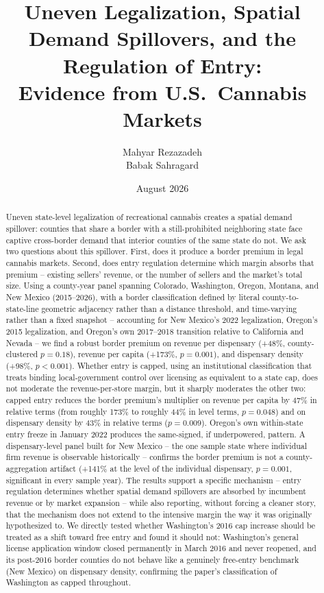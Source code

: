 \documentclass[12pt]{article}
\title{Uneven Legalization, Spatial Demand Spillovers, and the Regulation of Entry:\\
Evidence from U.S.\ Cannabis Markets}
\author{Mahyar Rezazadeh \\ Babak Sahragard}
\date{August 2026}
\begin{document}
\maketitle

\begin{singlespace}
\begin{abstract}
\noindent Uneven state-level legalization of recreational cannabis creates a spatial demand spillover: counties
that share a border with a still-prohibited neighboring state face captive cross-border demand that interior
counties of the same state do not. We ask two questions about this spillover. First, does it produce a border
premium in legal cannabis markets. Second, does entry regulation determine which margin absorbs that premium
-- existing sellers' revenue, or the number of sellers and the market's total size. Using a county-year panel
spanning Colorado, Washington, Oregon, Montana, and New Mexico (2015--2026), with a border classification
defined by literal county-to-state-line geometric adjacency rather than a distance threshold, and time-varying
rather than a fixed snapshot -- accounting for New Mexico's 2022 legalization, Oregon's 2015 legalization, and
Oregon's own 2017--2018 transition relative to California and Nevada -- we find a robust border premium on
revenue per dispensary (+48\%, county-clustered $p=0.18$), revenue per capita (+173\%,
$p=0.001$), and dispensary density (+98\%, $p<0.001$). Whether entry is capped, using an institutional
classification that treats binding local-government control over licensing as equivalent to a state cap, does
not moderate the revenue-per-store margin, but it sharply moderates the other two: capped entry reduces the
border premium's multiplier on revenue per capita by 47\% in relative terms (from roughly 173\% to roughly
44\% in level terms, $p=0.048$) and on dispensary density by 43\% in relative terms ($p=0.009$). Oregon's own
within-state entry freeze in January 2022 produces the same-signed, if
underpowered, pattern. A dispensary-level panel built for New Mexico -- the one sample state where individual
firm revenue is observable historically -- confirms the border premium is not a county-aggregation artifact
(+141\% at the level of the individual dispensary, $p=0.001$, significant in every sample year). The results
support a specific mechanism -- entry regulation determines whether spatial
demand spillovers are absorbed by incumbent revenue or by market expansion -- while also reporting, without
forcing a cleaner story, that the mechanism does not extend to the intensive margin the way it was originally
hypothesized to. We directly tested whether Washington's 2016 cap increase should be treated as a shift toward
free entry and found it should not: Washington's general license application window closed permanently in
March 2016 and never reopened, and its post-2016 border counties do not behave like a genuinely free-entry
benchmark (New Mexico) on dispensary density, confirming the paper's classification of
Washington as capped throughout.


\end{abstract}
\end{singlespace}
\end{document}

